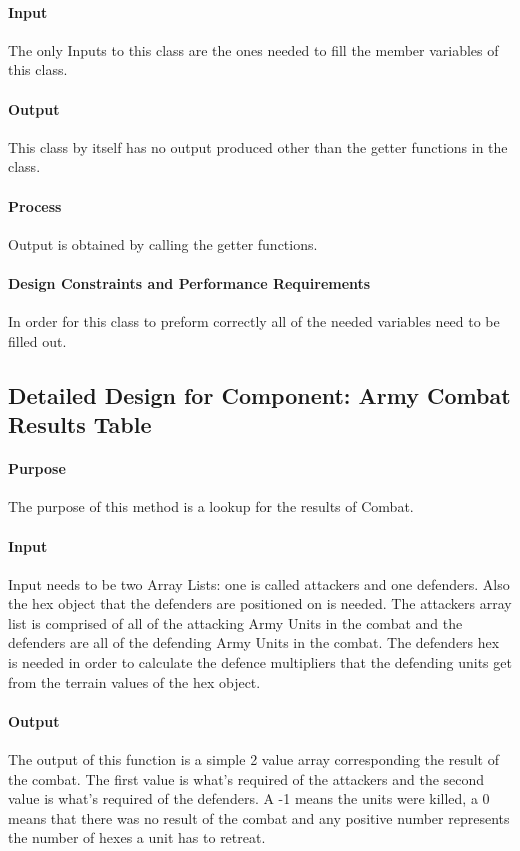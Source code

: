 \documentclass[12pt,a4paper,titlepage]{article}
\begin{document}
\paragraph{Input} The only Inputs to this class are the ones needed to fill the member variables of this class.
\paragraph{Output} This class by itself has no output produced other than the getter functions in the class.
\paragraph{Process} Output is obtained by calling the getter functions. 
\paragraph{Design Constraints and Performance Requirements}	In order for this class to preform correctly all of the needed variables need to be filled out.

\subsection{Detailed Design for Component: Army Combat Results Table}
\paragraph{Purpose} The purpose of this method is a lookup for the results of Combat. 
\paragraph{Input} Input needs to be two Array Lists: one is called attackers and one defenders. Also the hex object that the defenders are positioned on is needed. The attackers array list is comprised of all of the attacking Army Units in the combat and the defenders are all of the defending Army Units in the combat. The defenders hex is needed in order to calculate the defence multipliers that the defending units get from the terrain values of the hex object.
\paragraph{Output} The output of this function is a simple 2 value array corresponding the result of the combat. The first value is what's required of the attackers and the second value is what's required of the defenders. A -1 means the units were killed, a 0 means that there was no result of the combat and any positive number represents the number of hexes a unit has to retreat. 
\end{document}
